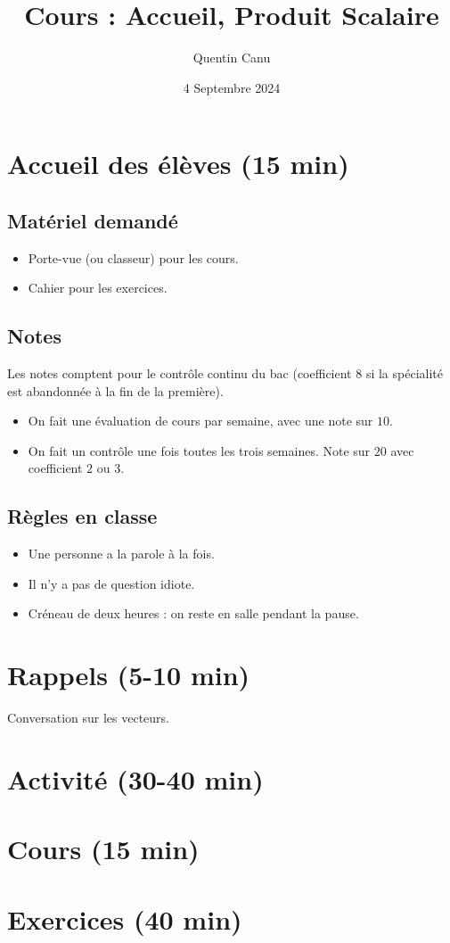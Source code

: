 \documentclass{article}
\title{Cours : Accueil, Produit Scalaire}
\date{4 Septembre 2024}
\author{Quentin Canu}
\begin{document}
\maketitle

\section{Accueil des élèves (15 min)}
\subsection{Matériel demandé}
\begin{itemize}
\item Porte-vue (ou classeur) pour les cours.
\item Cahier pour les exercices. 
\end{itemize}
\subsection{Notes}
Les notes comptent pour le contrôle continu du bac (coefficient $8$ si la spécialité est abandonnée à la fin de la première).
\begin{itemize}
\item On fait une évaluation de cours par semaine, avec une note sur $10$.
\item On fait un contrôle une fois toutes les trois semaines. Note sur $20$ avec coefficient $2$ ou $3$.
\end{itemize}
\subsection{Règles en classe}
\begin{itemize}
\item Une personne a la parole à la fois.
\item Il n'y a pas de question idiote. 
\item Créneau de deux heures : on reste en salle pendant la pause.
\end{itemize}
\section{Rappels (5-10 min)}
Conversation sur les vecteurs.

\section{Activité (30-40 min)}
\section{Cours (15 min)}
\section{Exercices (40 min)}
\end{document}
